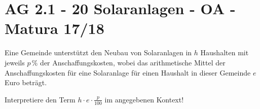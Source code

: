 \section{AG 2.1 - 20 Solaranlagen - OA - Matura 17/18}

\begin{beispiel}[AG 2.1]{1} %
Eine Gemeinde unterstützt den Neubau von Solaranlagen in $h$ Haushalten mit jeweils $p\,\%$ der Anschaffungskosten, wobei das arithmetische Mittel der Anschaffungskosten für eine Solaranlage für einen Haushalt in dieser Gemeinde $e$ Euro beträgt.

Interpretiere den Term $h\cdot e\cdot\frac{p}{100}$ im angegebenen Kontext!

\end{beispiel}
